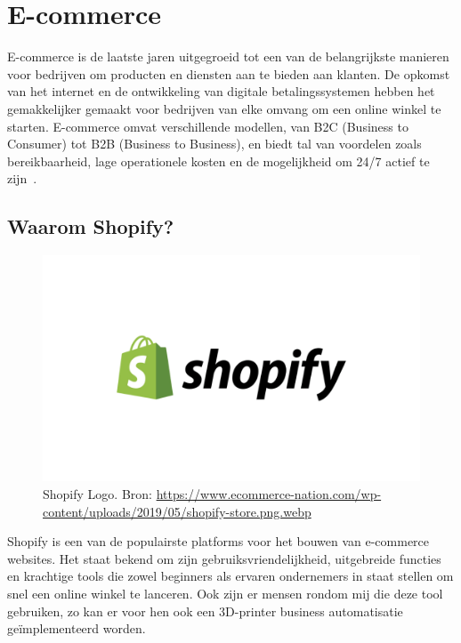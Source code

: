 \newpage

\section{E-commerce}%
\label{sec:E-commerce}

E-commerce is de laatste jaren uitgegroeid tot een van de belangrijkste manieren voor bedrijven om producten en diensten aan te bieden aan klanten. De opkomst van het internet en de ontwikkeling van digitale betalingssystemen hebben het gemakkelijker gemaakt voor bedrijven van elke omvang om een online winkel te starten. E-commerce omvat verschillende modellen, van B2C (Business to Consumer) tot B2B (Business to Business), en biedt tal van voordelen zoals bereikbaarheid, lage operationele kosten en de mogelijkheid om 24/7 actief te zijn~\autocite{bang2024}.

\subsection{Waarom Shopify?}

\begin{figure}
    \centering
    \includegraphics[width=0.8\linewidth]{Foto's/shopify-store}
    \caption{Shopify Logo. Bron: \url{https://www.ecommerce-nation.com/wp-content/uploads/2019/05/shopify-store.png.webp}}
    \label{fig:shopify-store}
\end{figure}


Shopify is een van de populairste platforms voor het bouwen van e-commerce websites. Het staat bekend om zijn gebruiksvriendelijkheid, uitgebreide functies en krachtige tools die zowel beginners als ervaren ondernemers in staat stellen om snel een online winkel te lanceren. Ook zijn er mensen rondom mij die deze tool gebruiken, zo kan er voor hen ook een 3D-printer business automatisatie geïmplementeerd worden.
\\

